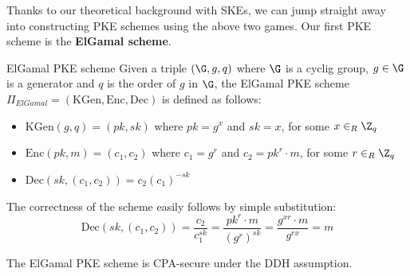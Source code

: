 \documentclass[a4paper, 12pt]{report}
\begin{document}
    Thanks to our theoretical background with SKEs, we can jump straight away into constructing PKE schemes using the above two games. Our first PKE scheme is the \textbf{ElGamal scheme}.

    \begin{framedalgo}{ElGamal PKE scheme}
        Given a triple $(\G,g,q)$ where $\G$ is a cyclig group, $g \in \G$ is a generator and $q$ is the order of $g$ in $\G$, the ElGamal PKE scheme $\Pi_{ElGamal} = (\mathrm{KGen}, \mathrm{Enc}, \mathrm{Dec})$ is defined as follows:
        \begin{itemize}
            \item $\mathrm{KGen}(g,q) = (pk, sk)$ where $pk = g^x$ and $sk = x$, for some  $x \in_R \Z_q$
            \item $\mathrm{Enc}(pk, m) = (c_1, c_2)$ where $c_1 = g^r$ and $c_2 = pk^r\cdot m$, for some $r \in_R \Z_q$
            \item $\mathrm{Dec}(sk, (c_1, c_2)) = c_2 (c_1)^{-sk}$ 
        \end{itemize}
    \end{framedalgo}

    The correctness of the scheme easily follows by simple substitution:
    \[\mathrm{Dec}(sk, (c_1, c_2)) = \frac{c_2}{c_1^{sk}} = \frac{pk^r \cdot m}{(g^{r})^{sk}} = \frac{g^{xr} \cdot m}{g^{rx}} = m\]

    \begin{framedthm}{}
        The ElGamal PKE scheme is CPA-secure under the DDH assumption.
    \end{framedthm}
\end{document}
